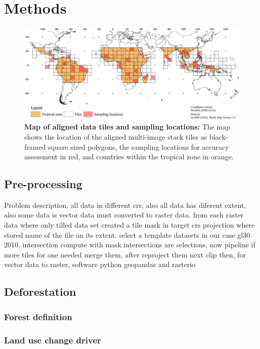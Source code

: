 \section{Methods}
\label{sec:methods}
	\begin{figure}[ht]
		\centering
		\includegraphics[scale=.97]{img/method_overview_frameless}
		\caption[Map of aligned data tiles and sampling locations]{\textbf{Map of aligned data tiles and sampling locations:} The map shows the location of the aligned multi-image stack tiles as black-framed square sized polygons, the sampling locations for accuracy assessment in red, and countries within the tropical zone in orange.}
		\label{fig:processing}
	\end{figure}

	\subsection{Pre-processing}
		Problem description, all data in different crs, also all data has diferent extent, also some data is vector data must converted to raster data. from each raster data where only tilled data set created a tile mask in target crs projection where stored name of the file an its extent. select a template datasets in our case gl30 2010. intersection compute with mask intersections are selections, now pipeline if more tiles for one needed merge them, after reproject them next clip then, for vector data to raster, software python geopandas and rasterio

	\subsection{Deforestation}
		\subsubsection{Forest definition}
			\lipsum[1-2]
		\subsubsection{Land use change driver}
			\lipsum[1-2]
